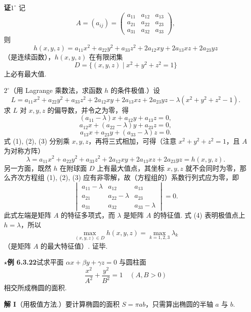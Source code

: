 \documentclass[UTF8, 12pt, fontset=fandol, oneside]{ctexart}
\begin{document}
\noindent\textbf{证}\quad $1^\circ$ 记
\[
  A=(a_{ij})=
  \begin{pmatrix}
    a_{11}&a_{12}&a_{13}\\
    a_{21}&a_{22}&a_{23}\\
    a_{31}&a_{32}&a_{33}
  \end{pmatrix},
\]
则
\[
  h(x,y,z)=a_{11}x^2+a_{22}y^2+a_{33}z^2
  +2a_{12}xy+2a_{13}xz+2a_{23}yz
\]
（是连续函数），$h(x,y,z)$ 在有限闭集
\[
  D=\{(x,y,z)\mid x^2+y^2+z^2=1\}
\]
上必有最大值.

$2^\circ$（用 Lagrange 乘数法，求函数 $h$ 的条件极值.）设
\[
  L=a_{11}x^2+a_{22}y^2+a_{33}z^2+2a_{12}xy+2a_{13}xz+2a_{23}yz
  -\lambda(x^2+y^2+z^2-1).
\]
求 $L$ 对 $x,y,z$ 的偏导数，并令之为零，得
\[
  (a_{11}-\lambda)x+a_{12}y+a_{13}z=0, \tag{1}
\]
\[
  a_{12}x+(a_{22}-\lambda)y+a_{23}z=0, \tag{2}
\]
\[
  a_{13}x+a_{23}y+(a_{33}-\lambda)z=0. \tag{3}
\]
式 (1), (2), (3) 分别乘 $x,y,z$，再将三式相加，可得（注意 $x^2+y^2+z^2=1$，且 $A$ 为对称方阵）
\[
  \lambda=a_{11}x^2+a_{22}y^2+a_{33}z^2
  +2a_{12}xy+2a_{13}xz+2a_{23}yz=h(x,y,z). \tag{4}
\]
另一方面，既然 $h$ 在附球面 $D$ 上有最大值点，其坐标 $x,y,z$ 就不会同时为零，那么齐次方程组 (1), (2), (3) 应有非零解，故（方程组的）系数行列式应为零，即
\[
  \begin{vmatrix}
    a_{11}-\lambda&a_{12}&a_{13}\\
    a_{21}&a_{22}-\lambda&a_{23}\\
    a_{31}&a_{32}&a_{33}-\lambda
  \end{vmatrix}=0. \tag{5}
\]
此式左端是矩阵 $A$ 的特征多项式，而 $\lambda$ 是矩阵 $A$ 的特征值. 式 (4) 表明极值点上 $h=\lambda$，所以
\[
  \max_{(x,y,z)\in D}h(x,y,z)=\max_{k=1,2,3}\lambda_k
\]
（是矩阵 $A$ 的最大特征值）. 证毕.

\noindent\textbf{\ensuremath{\star}例 6.3.22}\quad 试求平面 $\alpha x+\beta y+\gamma z=0$ 与圆柱面
\[
  \frac{x^2}{A^2}+\frac{y^2}{B^2}=1\quad(A,B>0)
\]
相交所成椭圆的面积.

\noindent\textbf{解 I}\quad （用极值方法.）要计算椭圆的面积 $S=\pi ab$，只需算出椭圆的半轴 $a$ 与 $b$.
\end{document}
